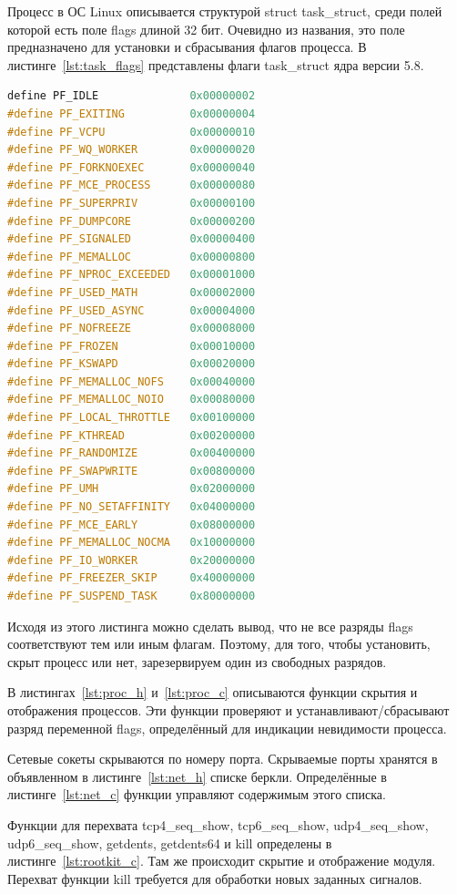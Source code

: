 Процесс в ОС Linux описывается структурой struct task\_struct, среди полей которой есть поле flags длиной 32 бит. Очевидно из названия, это поле предназначено для установки и сбрасывания флагов процесса. В листинге~\ref{lst:task_flags} представлены флаги task\_struct ядра версии 5.8.
\begin{lstlisting}[language=c,caption={Флаги task\_struct},label=lst:task_flags]
define PF_IDLE			    0x00000002	
#define PF_EXITING		    0x00000004	
#define PF_VCPU			    0x00000010	
#define PF_WQ_WORKER		0x00000020	
#define PF_FORKNOEXEC		0x00000040	
#define PF_MCE_PROCESS		0x00000080  
#define PF_SUPERPRIV		0x00000100	
#define PF_DUMPCORE		    0x00000200	
#define PF_SIGNALED		    0x00000400	
#define PF_MEMALLOC		    0x00000800	
#define PF_NPROC_EXCEEDED	0x00001000	
#define PF_USED_MATH		0x00002000	
#define PF_USED_ASYNC		0x00004000	
#define PF_NOFREEZE		    0x00008000	
#define PF_FROZEN		    0x00010000	
#define PF_KSWAPD		    0x00020000	
#define PF_MEMALLOC_NOFS	0x00040000	
#define PF_MEMALLOC_NOIO	0x00080000	
#define PF_LOCAL_THROTTLE	0x00100000	
#define PF_KTHREAD		    0x00200000	
#define PF_RANDOMIZE		0x00400000	
#define PF_SWAPWRITE		0x00800000	
#define PF_UMH			    0x02000000	
#define PF_NO_SETAFFINITY	0x04000000	
#define PF_MCE_EARLY		0x08000000  
#define PF_MEMALLOC_NOCMA	0x10000000	
#define PF_IO_WORKER		0x20000000	
#define PF_FREEZER_SKIP		0x40000000	
#define PF_SUSPEND_TASK		0x80000000  
\end{lstlisting}

Исходя из этого листинга можно сделать вывод, что не все разряды flags соответствуют тем или иным флагам. Поэтому, для того, чтобы установить, скрыт процесс или нет, зарезервируем один из свободных разрядов.

В листингах~\ref{lst:proc_h} и~\ref{lst:proc_c} описываются функции скрытия и отображения процессов. Эти функции проверяют и устанавливают/сбрасывают разряд переменной flags, определённый для индикации невидимости процесса.

Сетевые сокеты скрываются по номеру порта. Скрываемые порты хранятся в объявленном в листинге~\ref{lst:net_h} списке беркли. Определённые в листинге~\ref{lst:net_c} функции управляют содержимым этого списка.

Функции для перехвата tcp4\_seq\_show, tcp6\_seq\_show, udp4\_seq\_show, udp6\_seq\_show, getdents, getdents64 и kill определены в листинге~\ref{lst:rootkit_c}. Там же происходит скрытие и отображение модуля. Перехват функции kill требуется для обработки новых заданных сигналов.

